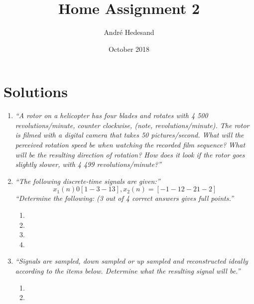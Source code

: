 \documentclass{article}
\title{Home Assignment 2}
\author{André Hedesand}
\date{October 2018}
\begin{document}
\maketitle
\thispagestyle{fancy}
\section{Solutions}
\begin{enumerate}
    \item %
        \emph{``A rotor on a helicopter has four blades and rotates with 4 500 revolutions/minute, counter clockwise, (note, revolutions/minute). The rotor is filmed with a digital camera that takes 50 pictures/second. What will the perceived rotation speed be when watching the recorded film sequence? What will be the resulting direction of rotation? How does it look if the
rotor goes slightly slower, with 4 499 revolutions/minute?''}


    \item %
        \emph{``The following discrete-time signals are given:''}
        \begin{displaymath}
            x_1(n) 0 [1 -3 -1 3], x_2(n) = [-1 -1 2 -2 1 -2]
        \end{displaymath}
        \emph{``Determine the following: (3 out of 4 correct answers gives full points.''}
            \begin{enumerate}
                \item %
                \item %
                \item %
                \item %
            \end{enumerate}

    \item %
        \emph{``Signals are sampled, down sampled or up sampled and reconstructed ideally according to the items below. Determine what the resulting signal will be.''}
        \begin{enumerate}
            \item %
            \item %
        \end{enumerate}
\end{enumerate}
\end{document}
